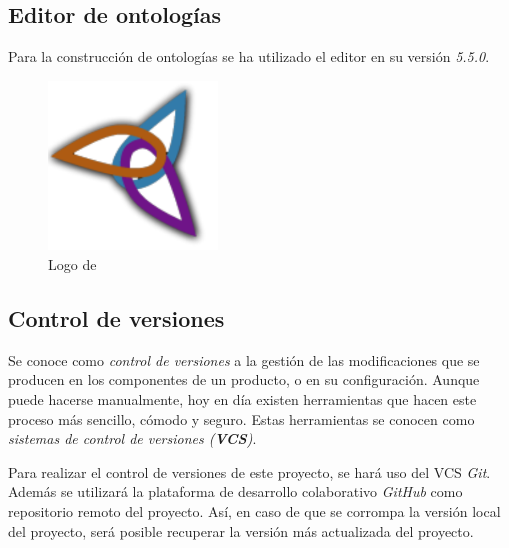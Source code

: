 \subsection{Editor de ontologías}
\label{Editor_ontologias}
Para la construcción de ontologías se ha utilizado el editor 
\protege en su versión \textit{5.5.0}.

\begin{figure}[H]
    \centering
    \begin{minipage}{0.38\textwidth}
        \centering
        \includegraphics[width=0.4\textwidth]{Figures/Logo_Protege.pdf}
        \caption{Logo de \protege}
    \end{minipage}
\end{figure}

\subsection{Control de versiones}
Se conoce como \textit{control de versiones} a la gestión de las modificaciones que se producen en los componentes de un producto, o en 
su configuración. Aunque puede hacerse manualmente, hoy en día existen herramientas que hacen este proceso más sencillo, cómodo y 
seguro. Estas herramientas se conocen como \textit{sistemas de control de versiones (\textbf{VCS})}.\medskip

Para realizar el control de versiones de este proyecto, se hará uso del VCS \textit{Git}. Además se utilizará la 
plataforma de desarrollo colaborativo \textit{GitHub} como repositorio remoto del proyecto. Así, en caso de que 
se corrompa la versión local del proyecto, será posible recuperar la versión más actualizada del proyecto.

